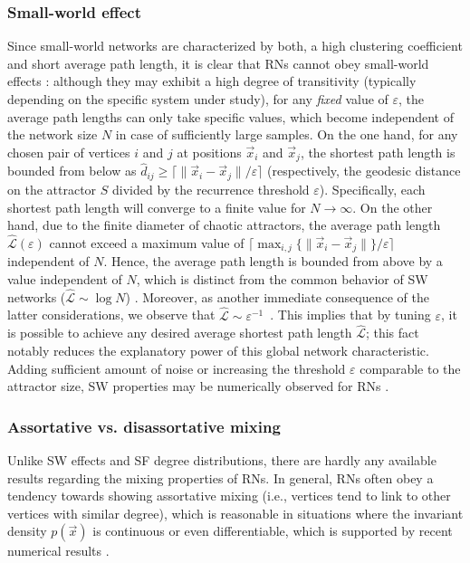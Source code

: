        		 \subsubsection{Small-world effect}
		Since small-world networks are characterized by both, a high clustering coefficient and short average path length, it is clear that RNs cannot obey small-world effects \cite{Donner2015RPBook,Jacob2017,Jacob2018}: although they may exhibit a high degree of transitivity (typically depending on the specific system under study), for any \emph{fixed} value of $\varepsilon$, the average path lengths can only take specific values, which become independent of the network size $N$ in case of sufficiently large samples. On the one hand, for any chosen pair of vertices $i$ and $j$ at positions $\vec{x}_i$ and $\vec{x}_j$, the shortest path length is bounded from below as $\hat{d}_{ij}\geq \lceil\|\vec{x}_i-\vec{x}_j\|/\varepsilon\rceil$ (respectively, the geodesic distance on the attractor $S$ divided by the recurrence threshold $\varepsilon$). Specifically, each shortest path length will converge to a finite value for $N\to\infty$. On the other hand, due to the finite diameter of chaotic attractors, the average path length $\hat{\mathcal{L}}(\varepsilon)$ cannot exceed a maximum value of $\lceil\max_{i,j}\{\|\vec{x}_i-\vec{x}_j\|\}/\varepsilon\rceil$ independent of $N$. Hence, the average path length is bounded from above by a value independent of $N$, which is distinct from the common behavior of SW networks ($\hat{\mathcal{L}}\sim \log N$) \cite{Watts1998}. Moreover, as another immediate consequence of the latter considerations, we observe that $\hat{\mathcal{L}}\sim\varepsilon^{-1}$~\cite{Donner2010a}. This implies that by tuning $\varepsilon$, it is possible to achieve any desired average shortest path length $\hat{\mathcal{L}}$; this fact notably reduces the explanatory power of this global network characteristic. Adding sufficient amount of noise or increasing the threshold $\varepsilon$ comparable to the attractor size, SW properties may be numerically observed for RNs \cite{Jacob2016a,Jacob2017}.


		\subsubsection{Assortative vs. disassortative mixing}
		Unlike SW effects and SF degree distributions, there are hardly any available results regarding the mixing properties of RNs. In general, RNs often obey a tendency towards showing assortative mixing (i.e., vertices tend to link to other vertices with similar degree), which is reasonable in situations where the invariant density $p(\vec{x})$ is continuous or even differentiable, which is supported by recent numerical results \cite{Donges2011,Donner2010a}.

